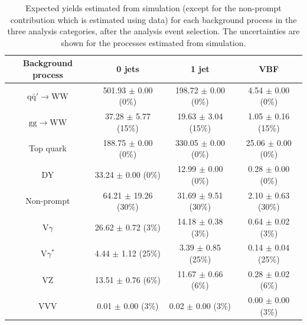 \begin{table}[htb]
\begin{center}
\caption{Expected yields estimated from simulation (except for the non-prompt contribution which is estimated using data) for each background process in the three analysis categories, after the analysis event selection. The uncertainties are shown for the processes estimated from simulation.}\label{tab:bkg_yields}
\small{
\begin{tabular}{c c c c }
\toprule
             Background process           &         0 jets                                          &          1 jet                                         &        VBF                                           \\
\midrule
      $\mathrm{q\bar{q}'\to WW}$                &    501.93 $\pm$       0.00 (0\%)              &     198.72 $\pm$       0.00 (0\%)             &      4.54 $\pm$       0.00 (0\%)               \\
      $\mathrm{gg\to WW}$                &     37.28 $\pm$       5.77 (15\%)              &      19.63 $\pm$       3.04 (15\%)             &      1.05 $\pm$       0.16 (15\%)               \\
      Top quark                &    188.75 $\pm$       0.00 (0\%)              &     330.05 $\pm$       0.00 (0\%)             &     25.06 $\pm$       0.00 (0\%)               \\
      DY                &     33.24 $\pm$       0.00 (0\%)              &      12.99 $\pm$       0.00 (0\%)             &      0.28 $\pm$       0.00 (0\%)               \\
      Non-prompt                &     64.21 $\pm$      19.26 (30\%)              &      31.69 $\pm$       9.51 (30\%)             &      2.10 $\pm$       0.63 (30\%)               \\
      V$\gamma$                &     26.62 $\pm$       0.72  (3\%)              &      14.18 $\pm$       0.38  (3\%)             &      0.64 $\pm$       0.02 (3\%)               \\
     V$\gamma^*$                &      4.44 $\pm$       1.12 (25\%)              &       3.39 $\pm$       0.85 (25\%)             &      0.14 $\pm$       0.04 (25\%)               \\
     VZ                &     13.51 $\pm$       0.76  (6\%)              &      11.67 $\pm$       0.66 (6\%)             &      0.28 $\pm$       0.02 (6\%)               \\
     VVV                &      0.01 $\pm$       0.00 (3\%)              &       0.02 $\pm$       0.00 (3\%)             &      0.00 $\pm$       0.00 (3\%)               \\   
     

\end{tabular}}
\end{center}
\end{table}
